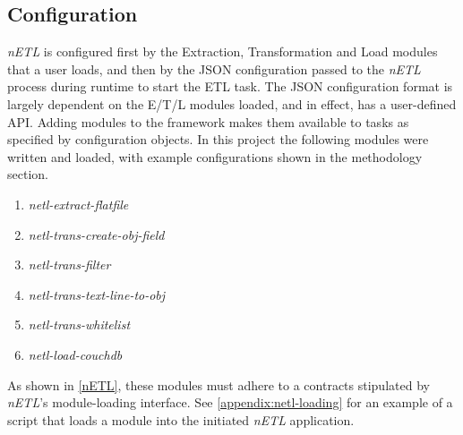 \subsection{Configuration}

\textit{nETL} is configured first by the Extraction, Transformation and Load modules that a user loads, and then by the JSON configuration passed to the \textit{nETL} process during runtime to start the ETL task. The JSON configuration format is largely dependent on the E/T/L modules loaded, and in effect, has a user-defined API. Adding modules to the framework makes them available to tasks as specified by configuration objects. In this project the following modules were written and loaded, with example configurations shown in the methodology section.

\begin{enumerate}
    \item \textit{netl-extract-flatfile}
    \item \textit{netl-trans-create-obj-field}
    \item \textit{netl-trans-filter}
    \item \textit{netl-trans-text-line-to-obj}
    \item \textit{netl-trans-whitelist}
    \item \textit{netl-load-couchdb}
\end{enumerate}

As shown in \ref{nETL}, these modules must adhere to a contracts stipulated by \textit{nETL}'s module-loading interface. See \ref{appendix:netl-loading} for an example of a script that loads a module into the initiated \textit{nETL} application.